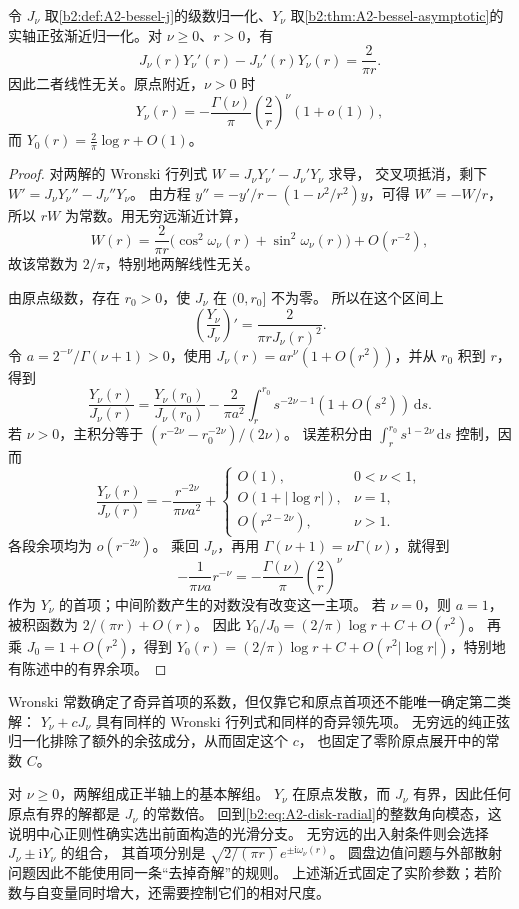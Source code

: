 \begin{proposition}
\label{b2:prop:A2-bessel-wronskian}
令 \(J_\nu\) 取\cref{b2:def:A2-bessel-j}的级数归一化、\(Y_\nu\) 取\cref{b2:thm:A2-bessel-asymptotic}的实轴正弦渐近归一化。对 \(\nu\ge0\)、\(r>0\)，有
\[J_\nu(r)Y_\nu'(r)-J_\nu'(r)Y_\nu(r)=\frac2{\pi r}.\]
因此二者线性无关。原点附近，\(\nu>0\) 时
\[Y_\nu(r)=-\frac{\Gamma(\nu)}\pi\left(\frac2r\right)^\nu(1+o(1)),\]
而 \(Y_0(r)=\frac2\pi\log r+O(1)\)。
\end{proposition}
\begin{proof}
对两解的 Wronski 行列式
\(W=J_\nu Y_\nu'-J_\nu'Y_\nu\) 求导，
交叉项抵消，剩下 \(W'=J_\nu Y_\nu''-J_\nu''Y_\nu\)。
由方程
\(y''=-y'/r-(1-\nu^2/r^2)y\)，可得 \(W'=-W/r\)，
所以 \(rW\) 为常数。用无穷远渐近计算，
\[
 W(r)=\frac2{\pi r}
 \bigl(\cos^2\omega_\nu(r)+\sin^2\omega_\nu(r)\bigr)
 +O(r^{-2}),
\]
故该常数为 \(2/\pi\)，特别地两解线性无关。

由原点级数，存在 \(r_0>0\)，使 \(J_\nu\) 在 \((0,r_0]\) 不为零。
所以在这个区间上
\[
 \left(\frac{Y_\nu}{J_\nu}\right)'=\frac2{\pi rJ_\nu(r)^2}.
\]
令 \(a=2^{-\nu}/\Gamma(\nu+1)>0\)，使用
\(J_\nu(r)=ar^\nu(1+O(r^2))\)，并从 \(r_0\) 积到 \(r\)，得到
\[
 \frac{Y_\nu(r)}{J_\nu(r)}
 =\frac{Y_\nu(r_0)}{J_\nu(r_0)}
 -\frac2{\pi a^2}\int_r^{r_0}s^{-2\nu-1}(1+O(s^2))\,\mathrm ds.
\]
若 \(\nu>0\)，主积分等于
\((r^{-2\nu}-r_0^{-2\nu})/(2\nu)\)。
误差积分由 \(\int_r^{r_0}s^{1-2\nu}\,\mathrm ds\) 控制，因而
\[
 \frac{Y_\nu(r)}{J_\nu(r)}
 =-\frac{r^{-2\nu}}{\pi\nu a^2}
 +\begin{cases}
 O(1),&0<\nu<1,\\
 O(1+|\log r|),&\nu=1,\\
 O(r^{2-2\nu}),&\nu>1.
 \end{cases}
\]
各段余项均为 \(o(r^{-2\nu})\)。
乘回 \(J_\nu\)，再用 \(\Gamma(\nu+1)=\nu\Gamma(\nu)\)，就得到
\[
 -\frac1{\pi\nu a}r^{-\nu}
 =-\frac{\Gamma(\nu)}\pi\left(\frac2r\right)^\nu
\]
作为 \(Y_\nu\) 的首项；中间阶数产生的对数没有改变这一主项。
若 \(\nu=0\)，则 \(a=1\)，被积函数为
\(2/(\pi r)+O(r)\)。
因此 \(Y_0/J_0=(2/\pi)\log r+C+O(r^2)\)。
再乘 \(J_0=1+O(r^2)\)，得到
\(Y_0(r)=(2/\pi)\log r+C+O(r^2|\log r|)\)，特别地有陈述中的有界余项。
\end{proof}

Wronski 常数确定了奇异首项的系数，但仅靠它和原点首项还不能唯一确定第二类解：
\(Y_\nu+cJ_\nu\) 具有同样的 Wronski 行列式和同样的奇异领先项。
无穷远的纯正弦归一化排除了额外的余弦成分，从而固定这个 \(c\)，
也固定了零阶原点展开中的常数 \(C\)。

\ProseParagraphBreak
对 \(\nu\geq0\)，两解组成正半轴上的基本解组。
\(Y_\nu\) 在原点发散，而 \(J_\nu\) 有界，因此任何原点有界的解都是 \(J_\nu\) 的常数倍。
回到\cref{b2:eq:A2-disk-radial}的整数角向模态，这说明中心正则性确实选出前面构造的光滑分支。
无穷远的出入射条件则会选择 \(J_\nu\pm\mathrm iY_\nu\) 的组合，
其首项分别是
\(\sqrt{2/(\pi r)}\,e^{\pm\mathrm i\omega_\nu(r)}\)。
圆盘边值问题与外部散射问题因此不能使用同一条“去掉奇解”的规则。
上述渐近式固定了实阶参数；若阶数与自变量同时增大，还需要控制它们的相对尺度。
